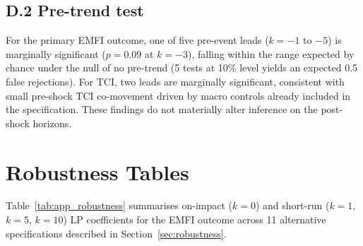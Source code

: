 \documentclass[11pt]{article}
\begin{document}
\subsection*{D.2 Pre-trend test}

For the primary EMFI outcome, one of five pre-event leads ($k = -1$ to $-5$) is marginally significant ($p = 0.09$ at $k = -3$), falling within the range expected by chance under the null of no pre-trend (5 tests at 10\% level yields an expected 0.5 false rejections). For TCI, two leads are marginally significant, consistent with small pre-shock TCI co-movement driven by macro controls already included in the specification. These findings do not materially alter inference on the post-shock horizons.

\section{Robustness Tables}
\label{app:robustness}

Table~\ref{tab:app_robustness} summarises on-impact ($k=0$) and short-run ($k=1$, $k=5$, $k=10$) LP coefficients for the EMFI outcome across 11 alternative specifications described in Section~\ref{sec:robustness}.
\end{document}
